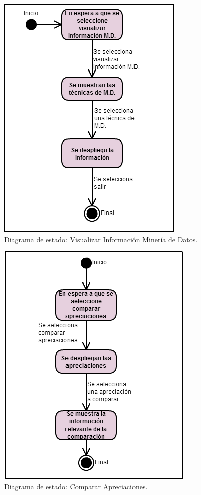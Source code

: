 \begin{figure}[htb]
	\label{dde8}
	\begin{center}
		\includegraphics[scale=0.6]{imagenes/VisualizarInfoMD.png}
	\end{center}
	\caption{Diagrama de estado: Visualizar Información Minería de Datos.}
\end{figure}


\begin{figure}[htb]
	\label{dde9}
	\begin{center}
		\includegraphics[scale=0.5]{imagenes/compararncfas.png}
	\end{center}
	\caption{Diagrama de estado: Comparar Apreciaciones.}
\end{figure}

